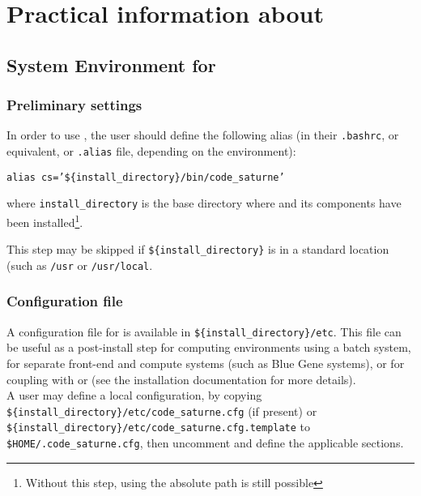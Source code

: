 \section{Practical information about \CS}

\subsection{System Environment for \CS}

\subsubsection{Preliminary settings}
\label{sec:prg_environementCS}

In order to use \CS, the user should define the following alias (in their \texttt{.bashrc},
or equivalent, or \texttt{.alias} file, depending on the environment):
\begin{center}
\texttt{alias cs='\$\{install\_directory\}/bin/code\_saturne'}
\end{center}
where \texttt{install\_directory} is the base directory where
\CS and its components have been installed\footnote{Without this step, using the absolute path is still possible}.

This step may be skipped if \texttt{\$\{install\_directory\}} is in a standard location (such as \texttt{/usr} or \texttt{/usr/local}.


\subsubsection{Configuration file}
A configuration file for \CS is available in \texttt{\$\{install\_directory\}/etc}. This file can be useful as a post-install step
for computing environments using a batch system, for separate front-end and compute systems (such as Blue Gene systems),
or for coupling with  or \CA (see the installation documentation for more details).\\

A user may define a local configuration, by copying
\texttt{\$\{install\_directory\}/etc/code\_saturne.cfg} (if present)
or \texttt{\$\{install\_directory\}/etc/code\_saturne.cfg.template} to\\
\texttt{\$HOME/.code\_saturne.cfg}, then uncomment and define the applicable sections.\\

